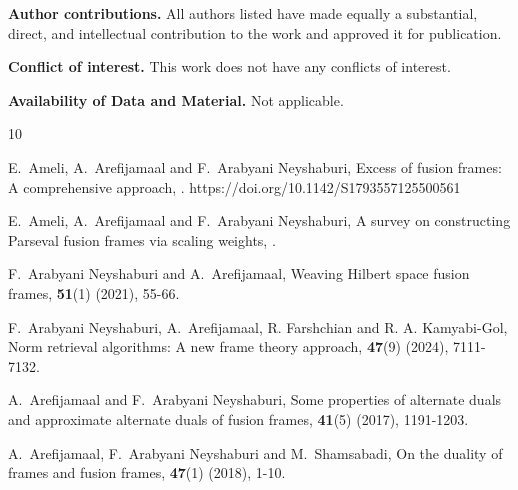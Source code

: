 \documentclass[sn-mathphys-num]{sn-jnl}%
\theoremstyle{definition}
\theoremstyle{remark}
\numberwithin{equation}{section}
\begin{document}
\textbf{Author contributions.} All authors listed have made equally a substantial, direct, and intellectual contribution to the work and approved it for publication.

\textbf{Conflict of interest.} This work does not have any conflicts of interest.
 
\textbf{Availability of Data and Material.} Not applicable.
 

\begin{thebibliography}{10}

E.~Ameli, A.~Arefijamaal and F.~Arabyani Neyshaburi,
\newblock Excess of fusion frames: A comprehensive approach,
.
https://doi.org/10.1142/S1793557125500561

E.~Ameli, A.~Arefijamaal and F.~Arabyani Neyshaburi,
\newblock A survey on constructing Parseval fusion frames via scaling weights,
.



F.~Arabyani Neyshaburi and A.~Arefijamaal,
\newblock Weaving Hilbert space fusion frames,
 \textbf{51}(1) (2021), 55-66.






F.~Arabyani Neyshaburi, A.~Arefijamaal, R. Farshchian and R. A. Kamyabi-Gol,
\newblock Norm retrieval algorithms: A new frame theory approach,
 \textbf{47}(9) (2024), 7111-7132.



A.~Arefijamaal and F.~Arabyani Neyshaburi,
\newblock Some properties of alternate duals and approximate alternate duals of fusion frames,
 \textbf{41}(5) (2017), 1191-1203.


A.~Arefijamaal, F.~Arabyani Neyshaburi and M.~Shamsabadi,
\newblock On the duality of frames and fusion frames,
 \textbf{47}(1) (2018), 1-10.


\end{thebibliography}
\end{document}
